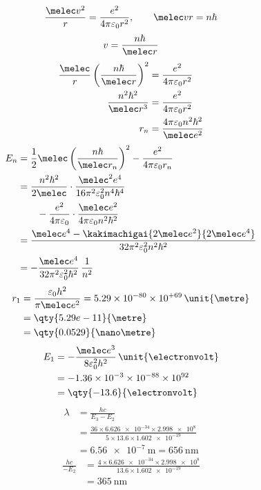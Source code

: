 \[ \frac{\melec v^{2}}{r}=\frac{e^{2}}{4\pi\varepsilon_{0}r^{2}},\qquad \melec vr=n\hbar \]
\[ v=\frac{n\hbar}{\melec r} \]
\begin{align*}
\frac{\melec}{r}\left(\frac{n\hbar}{\melec r}\right)^{2}&=\frac{e^{2}}{4\pi\varepsilon_{0}r^{2}}\\
\frac{n^{2}\hbar^{2}}{\melec r^{3}}&=\frac{e^{2}}{4\pi\varepsilon_{0}r^{2}}\\
r_{n}&=\frac{4\pi\varepsilon_{0}n^{2}\hbar^{2}}{\melec e^{2}}
\end{align*}
\begin{align*}
E_{n}&=\frac{1}{2}\melec\left(\frac{n\hbar}{\melec r_{n}}\right)^{2}-\frac{e^{2}}{4\pi\varepsilon_{0}r_{n}}\\
&=\frac{n^{2}\hbar^{2}}{2\melec}\cdot\frac{\melec^{2}e^{4}}{16\pi^{2}\varepsilon_{0}^{2}n^{4}\hbar^{4}}\\
&\qquad-\frac{e^{2}}{4\pi\varepsilon_{0}}\cdot\frac{\melec e^{2}}{4\pi\varepsilon_{0}n^{2}\hbar^{2}}\\
&=\frac{\melec e^{4}-\kakimachigai{2\melec e^{2}}{2\melec e^{4}}}{32\pi^{2}\varepsilon_{0}^{2}n^{2}\hbar^{2}}\\
&=-\frac{\melec e^{4}}{32\pi^{2}\varepsilon_{0}^{2}\hbar^{2}}\,\frac{1}{n^{2}}
\end{align*}
\begin{align*}
r_{1}&=\frac{\varepsilon_{0}h^{2}}{\pi\melec e^{2}}=5.29\times10^{-80}\times10^{+69}\,\unit{\metre}\\
&=\qty{5.29e-11}{\metre}\\
&=\qty{0.0529}{\nano\metre}
\end{align*}
\begin{align*}
E_{1}&=-\frac{\melec e^{3}}{8\varepsilon_{0}^{2}h^{2}}\,\unit{\electronvolt}\\
&=-1.36\times10^{-3}\times10^{-88}\times10^{92}\\
&=\qty{-13.6}{\electronvolt}
\end{align*}
\begin{align*}
\lambda&=\frac{hc}{E_{3}-E_{2}}\\
&=\frac{36\times\num{6.626e-34}\times\num{2.998e8}}{5\times13.6\times\num{1.602e-19}}\\
&=\qty{6.56e-7}{\metre}=\qty{656}{\nano\metre}
\end{align*}
\begin{align*}
\frac{hc}{-E_{2}}&=\frac{4\times\num{6.626e-34}\times\num{2.998e8}}{13.6\times\num{1.602e-19}}\\
&=\qty{365}{\nano\metre}
\end{align*}
